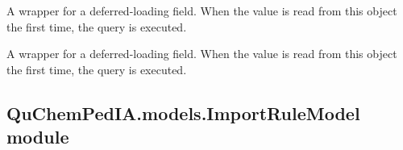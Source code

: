 \documentclass[letterpaper,10pt,english]{sphinxmanual}
\begin{document}
\begin{fulllineitems}
\begin{fulllineitems}
\end{fulllineitems}


\begin{fulllineitems}
\label{\detokenize{QuChemPedIA.models:QuChemPedIA.models.ImportFileModels.ImportFile.objects}}
\end{fulllineitems}


\begin{fulllineitems}
\label{\detokenize{QuChemPedIA.models:QuChemPedIA.models.ImportFileModels.ImportFile.path_file}}
A wrapper for a deferred-loading field. When the value is read from this
object the first time, the query is executed.

\end{fulllineitems}


\begin{fulllineitems}
\label{\detokenize{QuChemPedIA.models:QuChemPedIA.models.ImportFileModels.ImportFile.status}}
A wrapper for a deferred-loading field. When the value is read from this
object the first time, the query is executed.

\end{fulllineitems}


\end{fulllineitems}



\subsection{QuChemPedIA.models.ImportRuleModel module}
\label{\detokenize{QuChemPedIA.models:module-QuChemPedIA.models.ImportRuleModel}}\label{\detokenize{QuChemPedIA.models:quchempedia-models-importrulemodel-module}}
\end{document}

